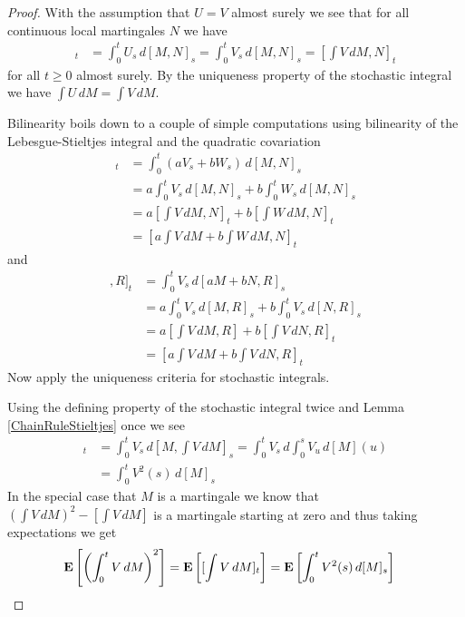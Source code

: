 \begin{proof}
With the assumption that $U = V$ almost surely we see that for all continuous local martingales $N$ we have
\begin{align*}
[\int U \, dM, N]_t &= \int_0^t U_s \, d[M,N]_s = \int_0^t V_s \, d[M,N]_s = [\int V \, dM, N]_t
\end{align*}
for all $t \geq 0$ almost surely.  By the uniqueness property of the stochastic integral we have $\int U \, dM = \int V \, dM$.

Bilinearity boils down to a couple of simple computations using bilinearity of the Lebesgue-Stieltjes integral and the quadratic covariation
\begin{align*}
[\int (aV + bU) \, dM, N]_t &= \int_0^t (aV_s + bW_s) \, d[M,N]_s \\
&= a\int_0^t V_s \, d[M,N]_s + b\int_0^t W_s \, d[M,N]_s \\
&= a[\int V \, dM, N]_t + b[\int W \, dM, N]_t \\
&= [a\int V \, dM + b\int W \, dM, N]_t
\end{align*}
and
\begin{align*}
[\int V \, d[aM + bN], R]_t &= \int_0^t V_s \, d[aM+bN, R]_s \\
&= a\int_0^t V_s \, d[M, R]_s + b\int_0^t V_s \, d[N, R]_s \\
&= a[\int V \, dM, R] + b[\int V \, dN, R]_t \\
&= [a\int V \, dM + b\int V \, dN, R]_t
\end{align*}
Now apply the uniqueness criteria for stochastic integrals.

Using the defining property of the stochastic integral twice and Lemma \ref{ChainRuleStieltjes} once we see
\begin{align*}
[\int V \, dM]_t &= \int_0^t V_s \, d[M, \int V \, dM]_s = \int_0^t V_s \, d\int_0^s V_u \, d[M](u) \\
&= \int_0^t V^2(s) \, d[M]_s
\end{align*}
In the special case that $M$ is a martingale we know that $\left(\int V \, dM\right)^2 - [\int V \, dM]$ is a martingale starting at zero and thus taking expectations we get
\begin{align*}
\textbf{E}\left[\left( \int_0^t V \, dM\right)^2\right] &= \textbf{E}\left[[\int V \, dM]_t\right] = \textbf{E}\left[\int_0^t V^2(s) \, d[M]_s\right]
\end{align*}


\end{proof}
